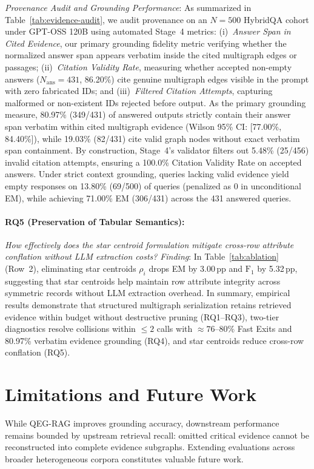 \documentclass[runningheads]{llncs}
\begin{document}
\emph{Provenance Audit and Grounding Performance}: As summarized in Table~\ref{tab:evidence-audit}, we audit provenance on an $N=500$ HybridQA cohort under GPT-OSS 120B using automated Stage~4 metrics: (i)~\emph{Answer Span in Cited Evidence}, our primary grounding fidelity metric verifying whether the normalized answer span appears verbatim inside the cited multigraph edges or passages; (ii)~\emph{Citation Validity Rate}, measuring whether accepted non-empty answers ($N_{\text{ans}}=431$, 86.20\%) cite genuine multigraph edges visible in the prompt with zero fabricated IDs; and (iii)~\emph{Filtered Citation Attempts}, capturing malformed or non-existent IDs rejected before output. As the primary grounding measure, 80.97\% (349/431) of answered outputs strictly contain their answer span verbatim within cited multigraph evidence (Wilson 95\% CI: [77.00\%, 84.40\%]), while 19.03\% (82/431) cite valid graph nodes without exact verbatim span containment. By construction, Stage~4's validator filters out 5.48\% (25/456) invalid citation attempts, ensuring a 100.0\% Citation Validity Rate on accepted answers. Under strict context grounding, queries lacking valid evidence yield empty responses on 13.80\% (69/500) of queries (penalized as 0 in unconditional EM), while achieving 71.00\% EM (306/431) across the 431 answered queries.

\paragraph{RQ5 (Preservation of Tabular Semantics):}
\emph{How effectively does the star centroid formulation mitigate cross-row attribute conflation without LLM extraction costs?} \emph{Finding}: In Table~\ref{tab:ablation} (Row~2), eliminating star centroids $\rho_i$ drops EM by 3.00\,pp and $\text{F}_1$ by 5.32\,pp, suggesting that star centroids help maintain row attribute integrity across symmetric records without LLM extraction overhead. In summary, empirical results demonstrate that structured multigraph serialization retains retrieved evidence within budget without destructive pruning (RQ1--RQ3), two-tier diagnostics resolve collisions within $\le 2$ calls with $\approx 76\text{--}80\%$ Fast Exits and 80.97\% verbatim evidence grounding (RQ4), and star centroids reduce cross-row conflation (RQ5).

\vspace{-2.5mm}
\section{Limitations and Future Work}
\label{sec:limitations}
\enlargethispage{8.5\baselineskip}
\vspace{-1mm}
While QEG-RAG improves grounding accuracy, downstream performance remains bounded by upstream retrieval recall: omitted critical evidence cannot be reconstructed into complete evidence subgraphs. Extending evaluations across broader heterogeneous corpora constitutes valuable future work.
\end{document}
